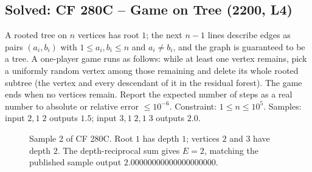 \subsection{Solved: CF 280C -- Game on Tree (2200, L4)}


\begin{problemstatement}
A rooted tree on \(n\) vertices has root \(1\); the next \(n-1\) lines
describe edges as pairs \((a_i,b_i)\) with \(1\le a_i,b_i\le n\) and
\(a_i\ne b_i\), and the graph is guaranteed to be a tree.  A one-player game
runs as follows: while at least one vertex remains, pick a uniformly random
vertex among those remaining and delete its whole rooted subtree (the vertex
and every descendant of it in the residual forest).  The game ends when no
vertices remain.  Report the expected number of steps as a real number to
absolute or relative error \(\le 10^{-6}\).  Constraint: \(1\le n\le
10^5\).  Samples: input \(2,1\;2\) outputs \(1.5\); input \(3,1\;2,1\;3\)
outputs \(2.0\).
\end{problemstatement}

\begin{figure}[H]
\centering
{}
\caption{Sample 2 of CF 280C.  Root \(1\) has depth \(1\); vertices \(2\) and
\(3\) have depth \(2\).  The depth-reciprocal sum gives \(E=2\), matching the
published sample output \(2.00000000000000000000\).}
\label{fig:c32-game}
\end{figure}

